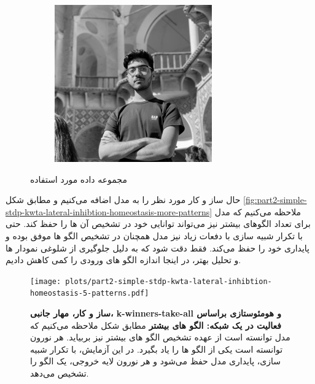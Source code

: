 \begin{figure}[!ht]
\begin{subfigure}[b]{0.17\textwidth}
                    \caption{}
                    \label{fig:waterloo-camera}
                \end{subfigure}
                \hfill
                \begin{subfigure}[b]{0.17\textwidth}
                    \centering
                    \includegraphics[width=\textwidth]{images/me.jpg}
                    \caption{}
                    \label{fig:extra-image}
                \end{subfigure}
            \caption{مجموعه داده مورد استفاده}
            \label{fig:part2-5-patterns}
        \end{figure}

        حال ساز و کار مورد نظر را به مدل اضافه می‌کنیم و مطابق شکل
        \ref{fig:part2-simple-stdp-kwta-lateral-inhibtion-homeostasis-more-patterns}
        ملاحظه می‌کنیم که مدل برای تعداد الگوهای بیشتر نیز می‌تواند توانایی خود در تشخیص آن ها را حفظ کند. حتی با تکرار شبیه سازی با دفعات زیاد نیز مدل همچنان در تشخیص الگو ها موفق بوده و پایداری خود را حفظ می‌کند. فقط دقت شود که به دلیل جلوگیری از شلوغی نمودار ها و تحلیل بهتر، در اینجا اندازه الگو های ورودی را کمی کاهش دادیم.

        \begin{figure}[!ht]
            \centering
            \texttt{[image: plots/part2-simple-stdp-kwta-lateral-inhibtion-homeostasis-5-patterns.pdf]} 
            \captionsetup{width=.9\linewidth}
            \caption{\textbf{ ساز و کار، مهار جانبی، 
            k-winners-take-all و 
            هومئوستازی براساس فعالیت در یک شبکه: الگو های بیشتر} مطابق شکل ملاحظه می‌کنیم که مدل توانسته است از عهده تشخیص الگو های بیشتر نیز بربیاید. هر نورون توانسته است یکی از الگو ها را یاد بگیرد. در این آزمایش، با تکرار شبیه سازی، پایداری مدل حفظ می‌شود و هر نورون لایه خروجی، یک الگو را تشخیص می‌دهد.}
            \label{fig:part2-simple-stdp-kwta-lateral-inhibtion-homeostasis-5-patterns}
        \end{figure}
